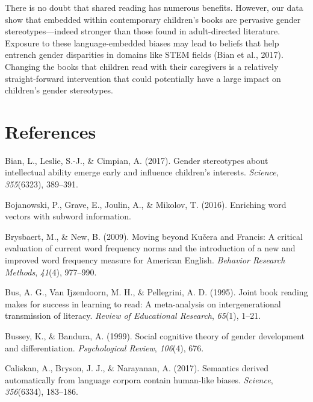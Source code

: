 \documentclass[english,,man,floatsintext]{apa6}
\begin{document}
There is no doubt that shared reading has numerous benefits. However, our data show that embedded within contemporary children's books are pervasive gender stereotypes---indeed stronger than those found in adult-directed literature. Exposure to these language-embedded biases may lead to beliefs that help entrench gender disparities in domains like STEM fields (Bian et al., 2017). Changing the books that children read with their caregivers is a relatively straight-forward intervention that could potentially have a large impact on children's gender stereotypes.

\newpage

\hypertarget{references}{%
\section{References}\label{references}}

\setlength{\parindent}{-0.5in}
\setlength{\leftskip}{0.5in}

\hypertarget{refs}{}
\leavevmode\hypertarget{ref-bian2017gender}{}%
Bian, L., Leslie, S.-J., \& Cimpian, A. (2017). Gender stereotypes about intellectual ability emerge early and influence children's interests. \emph{Science}, \emph{355}(6323), 389--391.

\leavevmode\hypertarget{ref-bojanowski2016enriching}{}%
Bojanowski, P., Grave, E., Joulin, A., \& Mikolov, T. (2016). Enriching word vectors with subword information.

\leavevmode\hypertarget{ref-brysbaert2009moving}{}%
Brysbaert, M., \& New, B. (2009). Moving beyond Kučera and Francis: A critical evaluation of current word frequency norms and the introduction of a new and improved word frequency measure for American English. \emph{Behavior Research Methods}, \emph{41}(4), 977--990.

\leavevmode\hypertarget{ref-bus1995joint}{}%
Bus, A. G., Van Ijzendoorn, M. H., \& Pellegrini, A. D. (1995). Joint book reading makes for success in learning to read: A meta-analysis on intergenerational transmission of literacy. \emph{Review of Educational Research}, \emph{65}(1), 1--21.

\leavevmode\hypertarget{ref-bussey1999social}{}%
Bussey, K., \& Bandura, A. (1999). Social cognitive theory of gender development and differentiation. \emph{Psychological Review}, \emph{106}(4), 676.

\leavevmode\hypertarget{ref-caliskan2017semantics}{}%
Caliskan, A., Bryson, J. J., \& Narayanan, A. (2017). Semantics derived automatically from language corpora contain human-like biases. \emph{Science}, \emph{356}(6334), 183--186.
\end{document}
